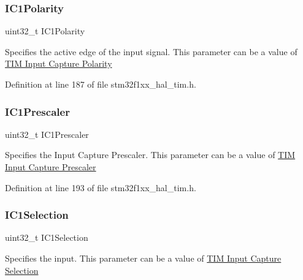 \subsubsection{\texorpdfstring{I\+C1\+Polarity}{IC1Polarity}}
{\footnotesize\ttfamily uint32\+\_\+t I\+C1\+Polarity}

Specifies the active edge of the input signal. This parameter can be a value of \hyperlink{group___t_i_m___input___capture___polarity}{T\+IM Input Capture Polarity} 

Definition at line 187 of file stm32f1xx\+\_\+hal\+\_\+tim.\+h.

\mbox{\label{struct_t_i_m___encoder___init_type_def_aa913a8df0a4c97fefa87ff760fae10cb}} 
\subsubsection{\texorpdfstring{I\+C1\+Prescaler}{IC1Prescaler}}
{\footnotesize\ttfamily uint32\+\_\+t I\+C1\+Prescaler}

Specifies the Input Capture Prescaler. This parameter can be a value of \hyperlink{group___t_i_m___input___capture___prescaler}{T\+IM Input Capture Prescaler} 

Definition at line 193 of file stm32f1xx\+\_\+hal\+\_\+tim.\+h.

\mbox{\label{struct_t_i_m___encoder___init_type_def_ae0c7ebe03057c1dd939555d1d924afd1}} 
\subsubsection{\texorpdfstring{I\+C1\+Selection}{IC1Selection}}
{\footnotesize\ttfamily uint32\+\_\+t I\+C1\+Selection}

Specifies the input. This parameter can be a value of \hyperlink{group___t_i_m___input___capture___selection}{T\+IM Input Capture Selection} 

